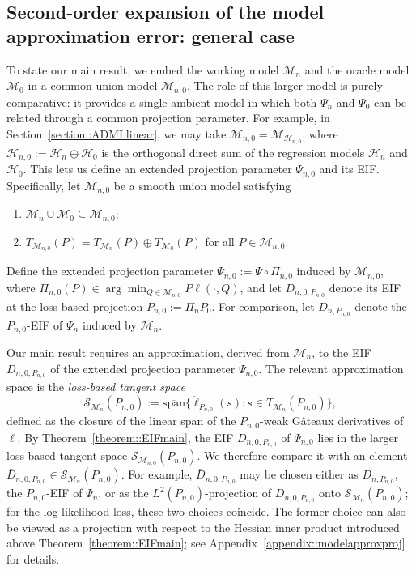 \documentclass[11pt]{article}
\theoremstyle{definition}
\begin{document}
\subsection{Second-order expansion of the model approximation error: general case}
 


 
 
To state our main result, we embed the working model \(\mathcal{M}_n\) and the oracle model \(\mathcal{M}_0\) in a common union model \(\mathcal{M}_{n,0}\). The role of this larger model is purely comparative: it provides a single ambient model in which both \(\Psi_n\) and \(\Psi_0\) can be related through a common projection parameter. For example, in Section~\ref{section::ADMLlinear}, we may take \(\mathcal{M}_{n,0} = \mathcal{M}_{\mathcal{H}_{n,0}}\), where \(\mathcal{H}_{n,0} := \mathcal{H}_n \oplus \mathcal{H}_0\) is the orthogonal direct sum of the regression models \(\mathcal{H}_n\) and \(\mathcal{H}_0\). This lets us define an extended projection parameter \(\Psi_{n,0}\) and its EIF. Specifically, let \(\mathcal{M}_{n,0}\) be a smooth union model satisfying
\begin{enumerate}
    \item[(i)] \(\mathcal{M}_n \cup \mathcal{M}_0 \subseteq \mathcal{M}_{n,0}\);
    \item[(ii)] \(T_{\mathcal{M}_{n,0}}(P) = T_{\mathcal{M}_n}(P) \oplus T_{\mathcal{M}_0}(P)\) for all \(P \in \mathcal{M}_{n,0}\).
\end{enumerate}
Define the extended projection parameter \(\Psi_{n,0} := \Psi \circ \Pi_{n,0}\) induced by \(\mathcal{M}_{n,0}\), where \(\Pi_{n,0}(P) \in \arg\min_{Q \in \mathcal{M}_{n,0}} P\ell(\cdot,Q)\), and let \(D_{n,0,P_{n,0}}\) denote its EIF at the loss-based projection \(P_{n,0} := \Pi_n P_0\). For comparison, let \(D_{n,P_{n,0}}\) denote the \(P_{n,0}\)-EIF of \(\Psi_n\) induced by \(\mathcal{M}_n\).
 

 
Our main result requires an approximation, derived from \(\mathcal{M}_n\), to the EIF \(D_{n,0,P_{n,0}}\) of the extended projection parameter \(\Psi_{n,0}\). The relevant approximation space is the \textit{loss-based tangent space}
\[
\mathcal{S}_{\mathcal{M}_n}(P_{n,0}) := \overline{\mathrm{span}}\{\dot{\ell}_{P_{n,0}}(s) : s \in T_{\mathcal{M}_n}(P_{n,0})\},
\]
defined as the closure of the linear span of the \(P_{n,0}\)-weak G\^{a}teaux derivatives of \(\ell\). By Theorem~\ref{theorem::EIFmain}, the EIF \(D_{n,0,P_{n,0}}\) of \(\Psi_{n,0}\) lies in the larger loss-based tangent space \(\mathcal{S}_{\mathcal{M}_{n,0}}(P_{n,0})\). We therefore compare it with an element \(\bar D_{n,0,P_{n,0}} \in \mathcal{S}_{\mathcal{M}_n}(P_{n,0})\). For example, \(\bar D_{n,0,P_{n,0}}\) may be chosen either as \(D_{n,P_{n,0}}\), the \(P_{n,0}\)-EIF of \(\Psi_n\), or as the \(L^2(P_{n,0})\)-projection of \(D_{n,0,P_{n,0}}\) onto \(\mathcal{S}_{\mathcal{M}_n}(P_{n,0})\); for the log-likelihood loss, these two choices coincide. The former choice can also be viewed as a projection with respect to the Hessian inner product introduced above Theorem~\ref{theorem::EIFmain}; see Appendix~\ref{appendix::modelapproxproj} for details.
\end{document}
